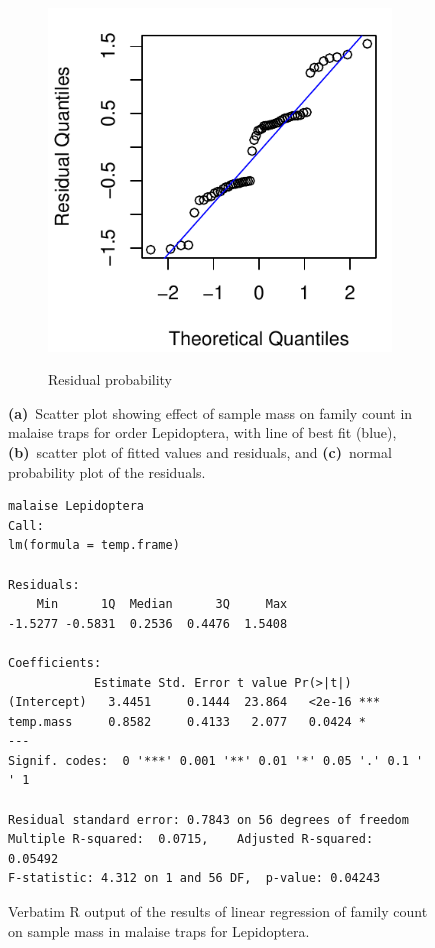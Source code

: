 \documentclass[10pt,letterpaper,twocolumn]{article}
\begin{document}
\begin{figure}[h]
\begin{subfigure}[b]{0.15\textwidth}
		\label{fig:malaise_lepidoptera_resid}
	\end{subfigure}
	~
	\begin{subfigure}[b]{0.15\textwidth}
		\caption{Residual probability}
		\includegraphics[width=\textwidth]{plots/mass-vs-count/qqplot/2015_malaise_Lepidoptera_qqplot.pdf}
		\label{fig:malaise_lepidoptera_qqplot}
	\end{subfigure}
	\caption{\textbf{(a)}~Scatter plot showing effect of sample mass on family count in malaise traps for order Lepidoptera, with line of best fit (blue), \textbf{(b)}~scatter plot of fitted values and residuals, and \textbf{(c)}~normal probability plot of the residuals.}
	\label{fig:malaise_lepidoptera}
	\smallskip
	\nointerlineskip
	\hrulefill
\end{figure}

\begin{figure}[h]
	\lstset{numbers=left}
	\lstset{xleftmargin=5mm,framexleftmargin=5mm}
	\begin{lstlisting}
malaise Lepidoptera
Call:
lm(formula = temp.frame)

Residuals:
    Min      1Q  Median      3Q     Max 
-1.5277 -0.5831  0.2536  0.4476  1.5408 

Coefficients:
            Estimate Std. Error t value Pr(>|t|)    
(Intercept)   3.4451     0.1444  23.864   <2e-16 ***
temp.mass     0.8582     0.4133   2.077   0.0424 *  
---
Signif. codes:  0 '***' 0.001 '**' 0.01 '*' 0.05 '.' 0.1 ' ' 1

Residual standard error: 0.7843 on 56 degrees of freedom
Multiple R-squared:  0.0715,	Adjusted R-squared:  0.05492 
F-statistic: 4.312 on 1 and 56 DF,  p-value: 0.04243
	\end{lstlisting}
	\caption{Verbatim R output of the results of linear regression of family count on sample mass in malaise traps for Lepidoptera.}
	\label{fig:malaise_lepidoptera_regression}
	\smallskip
	\nointerlineskip
	\hrulefill
\end{figure}
\end{document}
